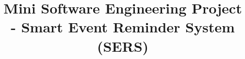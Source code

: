 \documentclass[12pt,twoside,a4paper]{hcmut_report}
\title{Mini Software Engineering Project - Smart Event Reminder System (SERS)}
\begin{document}
\coverpage






\end{document}
